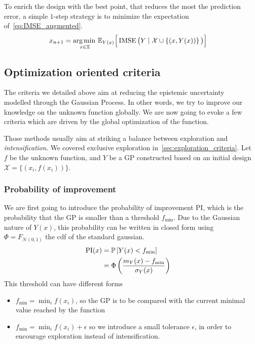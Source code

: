 \documentclass[../../Main_ManuscritThese.tex]{subfiles}
\begin{document}
To enrich the design with the best point, that reduces the most the prediction error, a simple $1$-step strategy is to minimize the expectation of~\cref{eq:IMSE_augmented}.
\begin{equation}
  x_{n+1} = \operatorname*{arg\,min \,}_{x\in \mathbb{X}}\mathbb{E}_{Y(x)}\Big[\operatorname{\mathrm{IMSE}}\big(Y \mid \mathcal{X} \cup \left\{(x, Y(x))\right\} \big)\Big]
\end{equation}

\subsection{Optimization oriented criteria}
\label{sec:GP_optimization_criteria}
The criteria we detailed above aim at reducing the epistemic uncertainty modelled through the Gaussian Process. In other words, we try to improve our knowledge on the unknown function globally. We are now going to evoke a few criteria which are driven by the global optimization of the function.

Those methods usually aim at striking a balance between exploration and \emph{intensification}. We covered exclusive exploration in~\cref{sec:exploration_criteria}.
Let $f$ be the unknown function, and $Y$ be a GP constructed based on an initial design $\mathcal{X} = \{(x_i, f(x_i))\}$.
\subsubsection{Probability of improvement}
We are first going to introduce the probability of improvement $\mathrm{PI}$, which is the probability that the GP is smaller than a threshold $f_{\min}$. Due to the Gaussian nature of $Y(x)$, this probability can be written in closed form using $\Phi = F_{\mathcal{N}(0, 1)}$ the cdf of the standard gaussian.
\begin{align}
  \mathrm{PI}(x) &= \Prob%
                   \left[Y(x) < f_{\min}\right] \\
                 &= \Phi\left(\frac{m_Y(x) - f_{\min}}{\sigma_Y(x)}\right)
\end{align}
This threshold can have different forms
\begin{itemize}
\item $f_{\min} = \min_{i} f(x_i)$, so the GP is to be compared with the current minimal value reached by the function
\item $f_{\min} = \min_i f(x_i) + \epsilon$ so we introduce a small tolerance $\epsilon$, in order to encourage exploration instead of intensification.
\end{itemize}
\end{document}

